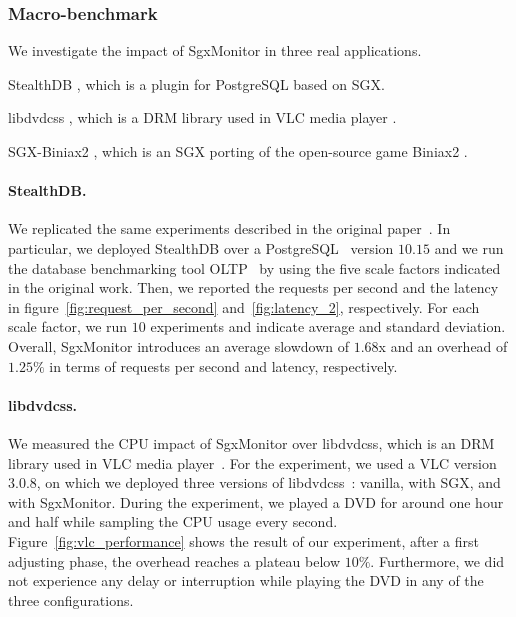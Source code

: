 \subsubsection{Macro-benchmark}
\label{sssec:macro-benchmar}

We investigate the impact of SgxMonitor in three real applications.
\begin{enumerate*}[label=(A\arabic*)]
	\item \textsf{StealthDB} \citep{stealthdb}, which is a plugin for 
	PostgreSQL \citep{momjian2001postgresql} based on SGX.
	\item \textsf{libdvdcss} \citep{libdvdcss}, which is a DRM library used in 
	VLC media player \citep{videolan}.
	\item \textsf{SGX-Biniax2} \citep{bauman2016case}, which is an SGX porting 
	of the open-source game Biniax2 \citep{biniax2}.
\end{enumerate*}

\paragraph{StealthDB.}
We replicated the same experiments described in the 
original paper~\citep{stealthdb}. 
In particular, we deployed \textsf{StealthDB} over a 
PostgreSQL~\citep{momjian2001postgresql} version $10.15$ 
and we run the database benchmarking tool OLTP~\citep{oltp} by using the
five scale factors indicated in the original work.
Then, we reported the requests per second and the latency in 
figure~\ref{fig:request_per_second} and~\ref{fig:latency_2}, respectively.
For each scale factor, we run $10$ experiments and indicate average and 
standard deviation.
Overall, SgxMonitor introduces an average slowdown of $1.68$x and an 
overhead 
of $1.25\%$ in terms of requests per second and latency, respectively.

\paragraph{libdvdcss.}
We measured the CPU impact of SgxMonitor over \textsf{libdvdcss}, which is 
an 
DRM library used in VLC media player~\citep{videolan}.
For the experiment, we used a VLC version $3.0.8$, on which we deployed three 
versions of \textsf{libdvdcss}~\citep{libdvdcss}: vanilla, with SGX, and with 
SgxMonitor.
During the experiment, we played a DVD for around one hour and half while 
sampling the CPU usage every second.
Figure~\ref{fig:vlc_performance} shows the result of our experiment, after a 
first adjusting phase, the overhead reaches a plateau below $10\%$.
Furthermore, we did not experience any delay or interruption while playing the 
DVD in any of the three configurations.


